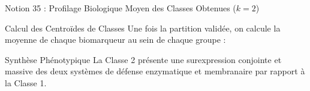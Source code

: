 \documentclass[aspectratio=169,10pt]{beamer}
\begin{document}
\begin{frame}{Notion 35 : Profilage Biologique Moyen des Classes Obtenues ($k = 2$)}
  \begin{conceptbox}{Calcul des Centroïdes de Classes}
    \footnotesize
    Une fois la partition validée, on calcule la moyenne de chaque biomarqueur au sein de chaque groupe :
    \begin{center}
    \end{center}
  \end{conceptbox}
  \vspace{1mm}
  \begin{takeawaybox}{Synthèse Phénotypique}
    \footnotesize
    La Classe 2 présente une surexpression conjointe et massive des deux systèmes de défense enzymatique et membranaire par rapport à la Classe 1.
  \end{takeawaybox}
\end{frame}
\end{document}
